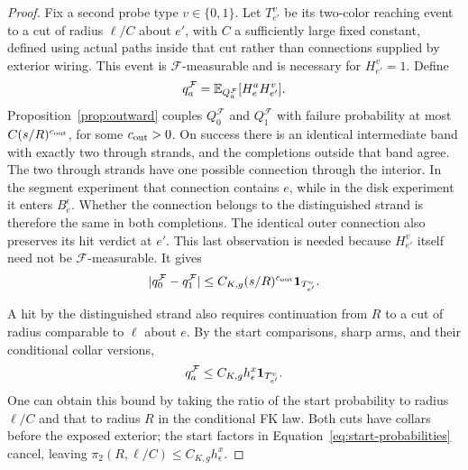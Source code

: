 \begin{proof}
Fix a second probe type $v\in\{0,1\}$.  Let $T_{e'}^v$ be its
two-color reaching event to a cut of radius $\ell/C$ about $e'$, with
$C$ a sufficiently large fixed constant, defined using actual paths
inside that cut rather than connections supplied by exterior wiring.
This event is
$\mathcal F$-measurable and is necessary for $H_{e'}^v=1$.
Define
\[
 q_a^{\mathcal F}
   =\mathbb E_{Q_a^{\mathcal F}}[H_e^aH_{e'}^v].
\]
Proposition~\ref{prop:outward} couples $Q_0^{\mathcal F}$ and
$Q_1^{\mathcal F}$ with failure probability at most
$C(s/R)^{c_{\rm out}}$, for some $c_{\rm out}>0$.  On success there is
an identical intermediate band with exactly two through strands, and
the completions outside that band agree.  The two through strands have
one possible connection through the interior.  In the segment
experiment that connection contains $e$, while in the disk experiment
it enters $B_e^\epsilon$.  Whether the connection belongs to the
distinguished strand is therefore the same in both completions.
The identical outer connection also preserves its hit verdict at $e'$.
This last observation is needed because $H_{e'}^v$ itself need not be
$\mathcal F$-measurable.  It gives
\begin{equation}
 |q_0^{\mathcal F}-q_1^{\mathcal F}|
 \le C_{K,g}(s/R)^{c_{\rm out}}\mathbf 1_{T_{e'}^v}.
 \label{eq:occupation-q-difference}
\end{equation}

A hit by the distinguished strand also requires continuation from
$R$ to a cut of radius comparable to $\ell$ about $e$.  By the start
comparisons, sharp arms, and their conditional collar versions,
\begin{equation}
 q_a^{\mathcal F}
    \le C_{K,g}h_\epsilon^x\mathbf 1_{T_{e'}^v}.
 \label{eq:occupation-q-bound}
\end{equation}
One can obtain this bound by taking the ratio of the start probability
to radius $\ell/C$ and that to radius $R$ in the conditional FK law.
Both cuts have collars before the exposed exterior; the start factors
in Equation~\eqref{eq:start-probabilities} cancel, leaving
$\pi_2(R,\ell/C)\le C_{K,g}h_\epsilon^x$.


\end{proof}
